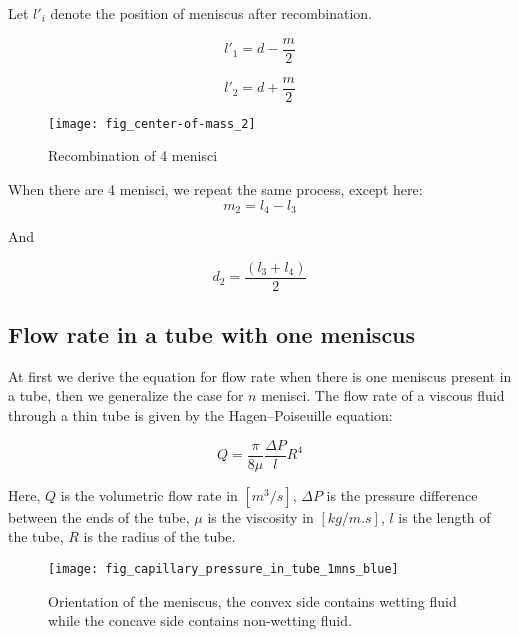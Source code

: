 	Let ${l'}_i$ denote the position of meniscus after recombination.
	
	\begin{equation}
		{l'}_1 = d - \frac{m}{2}
	\end{equation}
	
	\begin{equation}
		{l'}_2 = d + \frac{m}{2}
	\end{equation}
	

	\begin{figure}[H]
		\centering
		\texttt{[image: fig\_center-of-mass\_2]}
		\caption{Recombination of 4 menisci}
	\end{figure}
	
	When there are 4 menisci, we repeat the same process, except here:
	\begin{equation}
		m_2 = l_4 - l_3
	\end{equation}
	
	And
	
	\begin{equation}	
		d_2 = \frac{(l_3 + l_4)}{2}
	\end{equation}

\subsection{Flow rate in a tube with one meniscus} \label{sec:simple-flow-rate}
	At first we derive the equation for flow rate when there is one meniscus present in a tube, then we generalize the case for $n$ menisci. The flow rate of a viscous fluid through a thin tube is given by the Hagen–Poiseuille equation:
	
	\begin{equation} \label{eq:flow-rate}
		Q = \frac{\pi}{8\mu} \frac{\Delta P}{l} R^4
	\end{equation}
	
	Here, $Q$ is the volumetric flow rate in $[m^3/s]$, $\Delta P$ is the pressure difference between the ends of the tube, $\mu$ is the viscosity in $[kg/m.s]$, $l$ is the length of the tube, $R$ is the radius of the tube.
	
	\begin{figure}[H]
		\centering
		\texttt{[image: fig\_capillary\_pressure\_in\_tube\_1mns\_blue]}
		\caption{Orientation of the meniscus, the convex side contains wetting fluid while the concave side contains non-wetting fluid.}
		\label{fig_capillary_pressure_in_tube_1mns_blue}
	\end{figure}
	
